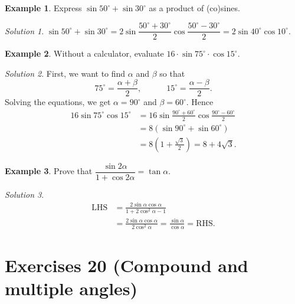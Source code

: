 \documentclass[
  12pt,
  oneside]{book}
\theoremstyle{definition}
\theoremstyle{definition}
\newtheorem{example}{Example}[chapter]
\theoremstyle{definition}
\theoremstyle{definition}
\theoremstyle{remark}
\newtheorem*{solution}{Solution}
\begin{document}
\begin{example}
Express \(\sin50^\circ + \sin30^\circ\) as a product of (co)sines.
\end{example}

\begin{solution}
\(\sin50^\circ+\sin30^\circ = 2\sin\dfrac{50^\circ+30^\circ}{2}\cos\dfrac{50^\circ-30^\circ}{2} = 2\sin 40^\circ\cos 10^\circ\).
\end{solution}

\begin{example}
Without a calculator, evaluate \(16\cdot\sin75^\circ\cdot \cos15^\circ\).
\end{example}

\begin{solution}
First, we want to find \(\alpha\) and \(\beta\) so that
\[
75^\circ=\frac{\alpha+\beta}{2}, \quad\quad\quad
15^\circ=\frac{\alpha-\beta}{2}.
\]
Solving the equations, we get \(\alpha=90^\circ\) and \(\beta=60^\circ\). Hence
\begin{align*}
16\sin 75^\circ\cos15^\circ &= 16\sin\frac{90^\circ+60^\circ}{2}\cos\frac{90^\circ-60^\circ}{2}\\
&= 8(\sin90^\circ+\sin60^\circ)\\
&= 8\left(1+\frac{\sqrt3}{2}\right) = 8 + 4\sqrt{3}.
\end{align*}
\end{solution}

\begin{example}
Prove that \(\dfrac{\sin2\alpha}{1+\cos2\alpha}=\tan\alpha\).
\end{example}

\begin{solution}
\begin{align*}
\mathrm{LHS} &=
\frac{2\sin\alpha\cos\alpha}{1+2\cos^2\alpha -1}\\
&= \frac{2\sin\alpha\cos\alpha}{2\cos^2\alpha} = \frac{\sin\alpha}{\cos\alpha} = \mathrm{RHS}.
\end{align*}
\end{solution}

\hypertarget{exercises-20-compound-and-multiple-angles}{%
\chapter*{Exercises 20 (Compound and multiple angles)}\label{exercises-20-compound-and-multiple-angles}}
\end{document}
